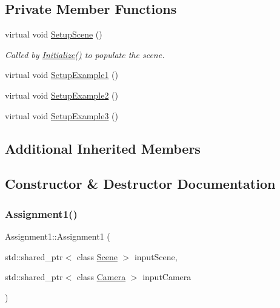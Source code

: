 \subsection*{Private Member Functions}
\begin{DoxyCompactItemize}
\item 
virtual void \hyperlink{class_assignment1_a8d12cf21f1463caa5a8da45110b50103}{Setup\+Scene} ()
\begin{DoxyCompactList}\small\item\em Called by \hyperlink{class_application_a17cf1ea4552d26a1c20f7d98d793d41d}{Initialize()} to populate the scene. \end{DoxyCompactList}\item 
virtual void \hyperlink{class_assignment1_a07743a6d86f7603dd58339c4db1de192}{Setup\+Example1} ()
\item 
virtual void \hyperlink{class_assignment1_aeabed7b579d59a6fdacaeab468afba29}{Setup\+Example2} ()
\item 
virtual void \hyperlink{class_assignment1_afbb3cb7765b899e69c9847d29f045392}{Setup\+Example3} ()
\end{DoxyCompactItemize}
\subsection*{Additional Inherited Members}


\subsection{Constructor \& Destructor Documentation}
\hypertarget{class_assignment1_ade9ef18c233dab37d37f20760fe7674d}{}\label{class_assignment1_ade9ef18c233dab37d37f20760fe7674d} 
\subsubsection{\texorpdfstring{Assignment1()}{Assignment1()}}
{\footnotesize\ttfamily Assignment1\+::\+Assignment1 (\begin{DoxyParamCaption}\item[{std\+::shared\+\_\+ptr$<$ class \hyperlink{class_scene}{Scene} $>$}]{input\+Scene,  }\item[{std\+::shared\+\_\+ptr$<$ class \hyperlink{class_camera}{Camera} $>$}]{input\+Camera }\end{DoxyParamCaption})}



